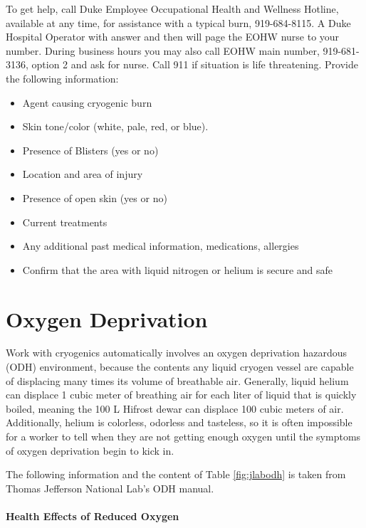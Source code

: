 To get help\cite{epling}, call Duke Employee Occupational Health and Wellness Hotline, available at any time, for assistance with a typical burn, 919-684-8115.  A Duke Hospital Operator with answer and then will page the EOHW nurse to your number.  During business hours you may also call EOHW main number, 919-681-3136, option 2 and ask for nurse.  Call 911 if situation is life threatening.  Provide the following information\cite{epling}:

\begin{itemize}
\item Agent causing cryogenic burn
\item Skin tone/color (white, pale, red, or blue).
\item Presence of Blisters (yes or no)
\item Location and area of injury
\item Presence of open skin (yes or no)
\item Current treatments
\item Any additional past medical information, medications, allergies
\item Confirm that the area with liquid nitrogen or helium is secure and safe
\end{itemize}

\section{Oxygen Deprivation}

Work with cryogenics automatically involves an oxygen deprivation hazardous (ODH) environment, because the contents any liquid cryogen vessel are capable of displacing many times its volume of breathable air.  Generally, liquid helium can displace 1 cubic meter of breathing air for each liter of liquid that is quickly boiled, meaning the 100 L Hifrost dewar can displace 100 cubic meters of air.  Additionally, helium is colorless, odorless and tasteless, so it is often impossible for a worker to tell when they are not getting enough oxygen until the symptoms of oxygen deprivation begin to kick in.

The following information and the content of Table \ref{fig:jlabodh} is taken from Thomas Jefferson National Lab's ODH manual. \cite{jlabodh}

 
\paragraph{Health Effects of Reduced Oxygen}

